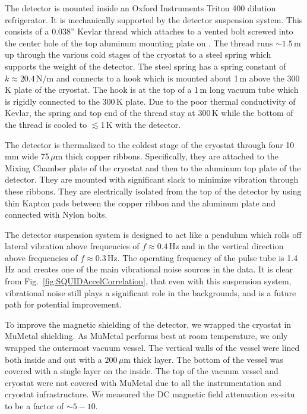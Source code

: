\documentclass[aps,prd,amsmath,amssymb,reprint,superscriptaddress, nofootinbib,
]{revtex4-1}
\begin{document}
The \abra detector is mounted inside an Oxford Instruments Triton 400 dilution refrigerator. It is mechanically supported by the detector suspension system. This consists of a 0.038'' Kevlar thread which attaches to a vented bolt screwed into the center hole of the top aluminum mounting plate on \abra. The thread runs $\sim1.5$\,m up through the various cold stages of the cryostat to a steel spring which supports the weight of the detector. The steel spring has a spring constant of $k\approx20.4$\,N/m and connects to a hook which is mounted about 1\,m above the 300\,K plate of the cryostat. The hook is at the top of a 1\,m long vacuum tube which is rigidly connected to the 300\,K plate. Due to the poor thermal conductivity of Kevlar, the spring and top end of the thread stay at 300\,K while the bottom of the thread is cooled to $\lesssim$1\,K with the detector.

The detector is thermalized to the coldest stage of the cryostat through four 10\,mm wide 75\,$\mu$m thick copper ribbons. Specifically, they are attached to the Mixing Chamber plate of the cryostat and then to the aluminum top plate of the detector. They are mounted with significant slack to minimize vibration through these ribbons. They are electrically isolated from the top of the detector by using thin Kapton pads between the copper ribbon and the aluminum plate and connected with Nylon bolts.  

The detector suspension system is designed to act like a pendulum which rolls off lateral vibration above frequencies of $f\approx0.4$\,Hz and in the vertical direction above frequencies of $f\approx0.3$\,Hz. The operating frequency of the pulse tube is 1.4\,Hz and creates one of the main vibrational noise sources in the \abra data. It is clear from Fig.~\ref{fig:SQUIDAccelCorrelation}, that even with this suspension system, vibrational noise still plays a significant role in the \abra backgrounds, and is a future path for potential improvement.

To improve the magnetic shielding of the detector, we wrapped the cryostat in MuMetal shielding. As MuMetal performs best at room temperature, we only wrapped the outermost vacuum vessel. The vertical walls of the vessel were lined both inside and out with a $200\,\mu$m thick layer. The bottom of the vessel was covered with a single layer on the inside. The top of the vacuum vessel and cryostat were not covered with MuMetal due to all the instrumentation and cryostat infrastructure. We measured the DC magnetic field attenuation ex-situ to be a factor of $\sim 5-10$.
\end{document}

